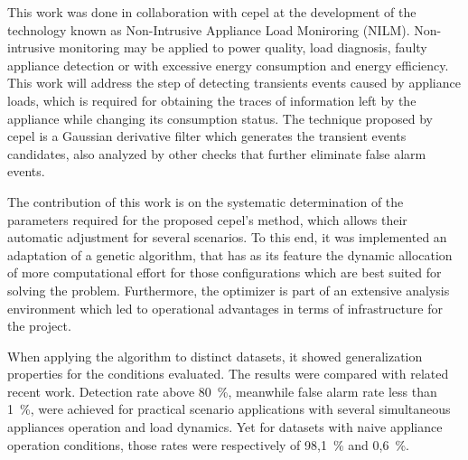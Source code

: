 \begin{foreignabstract}

This work was done in collaboration with \acs{cepel} at the
development of the technology known as Non-Intrusive Appliance Load
Moniroring (NILM). Non-intrusive monitoring may be applied to power
quality, load diagnosis, faulty appliance detection or with excessive
energy consumption and energy efficiency. This work will address the
step of detecting transients events caused by appliance loads, which
is required for obtaining the traces of information left by the
appliance while changing its consumption status. The technique
proposed by \acs{cepel} is a Gaussian derivative filter which
generates the transient events candidates, also analyzed by other
checks that further eliminate false alarm events.

The contribution of this work is on the systematic determination of
the parameters required for the proposed \acs{cepel}'s method, which
allows their automatic adjustment for several scenarios. To this end,
it was implemented an adaptation of a genetic algorithm, that has as
its feature the dynamic allocation of more computational effort for
those configurations which are best suited for solving the problem.
Furthermore, the optimizer is part of an extensive analysis
environment which led to operational advantages in terms of
infrastructure for the project.

When applying the algorithm to distinct datasets, it showed
generalization properties for the conditions evaluated. The results
were compared with related recent work. Detection rate above 80~\%,
meanwhile false alarm rate less than 1~\%, were achieved for practical
scenario applications with several simultaneous appliances operation
and load dynamics. Yet for datasets with naive appliance operation
conditions, those rates were respectively of 98,1~\% and 0,6~\%.


\end{foreignabstract}

